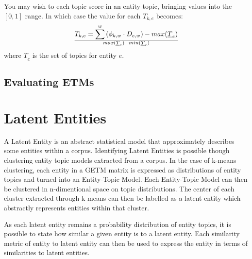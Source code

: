 \documentclass[10pt]{report}
\begin{document}
You may wish to each topic score in an entity topic, bringing values into the \([0,1]\) range. In which case the value for each \(T_{k,e}\) becomes:
\[
  T_{k,e} = {\sum^w {(\phi_{k,w} \cdot D_{e,w})} - max(\underline{T}_e)}\over{ max(\underline{T}_e) - min(\underline{T}_e)}
\]
where \(\underline{T}_e\) is the set of topics for entity \(e\).

\subsection{Evaluating ETMs}

\section{Latent Entities}
A Latent Entity is an abstract statistical model that approximately describes some entities within a corpus. Identifying Latent Entities is possible though clustering entity topic models extracted from a corpus. In the case of k-means clustering, each entity in a GETM matrix is expressed as distributions of entity topics and turned into an Entity-Topic Model. Each Entity-Topic Model can then be clustered in n-dimentional space on topic distributions. The center of each cluster extracted through k-means can then be labelled as a latent entity which abstractly represents entities within that cluster.

As each latent entity remains a probability distribution of entity topics, it is possible to state how similar a given entity is to a latent entity. Each similarity metric of entity to latent entity can then be used to express the entity in terms of similarities to latent entities.
\end{document}
